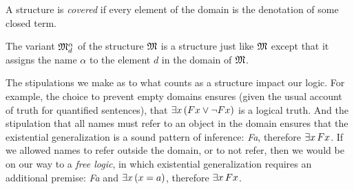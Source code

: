\documentclass[syntax-and-semantics]{subfiles}
\begin{document}
\begin{defn}
A structure is \emph{covered} if every element of the domain is the denotation of some closed term. 
\end{defn}

\begin{defn}
The variant $\mathfrak{M}^\alpha_d$ of the structure $\mathfrak{M}$ is a structure just like $\mathfrak{M}$ except that it assigns the name $\alpha$ to the element $d$ in the domain of $\mathfrak{M}$.
\end{defn}


The stipulations we make as to what counts as a structure impact our logic. For example, the choice to prevent empty domains ensures (given the usual account of truth for quantified sentences), that $\lexists[x][(Fx \lor \lnot Fx)]$ is a logical truth. And the stipulation that all names must refer to an object in the domain ensures that the existential generalization is a sound pattern of inference: \emph{Fa}, therefore $\lexists[x][Fx]$. If we allowed names to refer outside the domain, or to not refer, then we would be on our way to a \emph{free logic}, in which existential generalization requires an additional premise: \emph{Fa} and $\lexists[x][(x=a)]$, therefore $\lexists[x][Fx]$.
\end{document}
